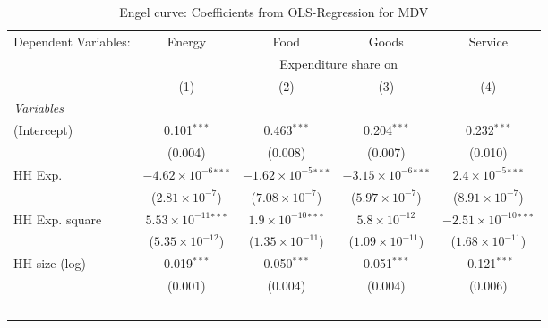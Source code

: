 
\begin{table}[htbp!]
   \centering
   \small
   \begin{adjustbox}{width = 1\textwidth, max height = 0.95\textheight, center}
      \begin{threeparttable}[b]
         \caption{\label{tab:Engel_parametric_MDV} Engel curve: Coefficients from OLS-Regression for MDV}
         \begin{tabular}{lcccc}
            \tabularnewline \midrule \midrule
            Dependent Variables: & Energy                         & Food                           & Goods                          & Service\\  
             & \multicolumn{4}{c}{Expenditure share on} \\ 
                                 & (1)                            & (2)                            & (3)                            & (4)\\  
            \midrule
            \emph{Variables}\\
            (Intercept)          & 0.101$^{***}$                  & 0.463$^{***}$                  & 0.204$^{***}$                  & 0.232$^{***}$\\   
                                 & (0.004)                        & (0.008)                        & (0.007)                        & (0.010)\\   
            HH Exp.              & $-4.62\times 10^{-6}$$^{***}$  & $-1.62\times 10^{-5}$$^{***}$  & $-3.15\times 10^{-6}$$^{***}$  & $2.4\times 10^{-5}$$^{***}$\\    
                                 & ($2.81\times 10^{-7}$)         & ($7.08\times 10^{-7}$)         & ($5.97\times 10^{-7}$)         & ($8.91\times 10^{-7}$)\\    
            HH Exp. square       & $5.53\times 10^{-11}$$^{***}$  & $1.9\times 10^{-10}$$^{***}$   & $5.8\times 10^{-12}$           & $-2.51\times 10^{-10}$$^{***}$\\    
                                 & ($5.35\times 10^{-12}$)        & ($1.35\times 10^{-11}$)        & ($1.09\times 10^{-11}$)        & ($1.68\times 10^{-11}$)\\    
            HH size (log)        & 0.019$^{***}$                  & 0.050$^{***}$                  & 0.051$^{***}$                  & -0.121$^{***}$\\   
                                 & (0.001)                        & (0.004)                        & (0.004)                        & (0.006)\\   
$$
\end{tabular}
\end{threeparttable}
\end{adjustbox}
\end{table}
